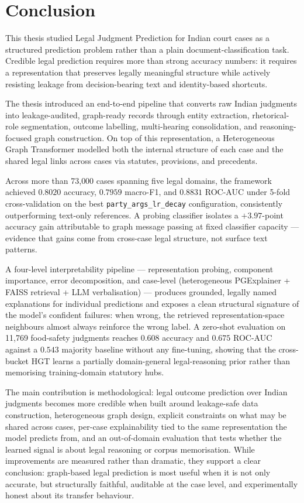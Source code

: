 \chapter{Conclusion}

This thesis studied Legal Judgment Prediction for Indian court cases as a structured prediction problem rather than a plain document-classification task. Credible legal prediction requires more than strong accuracy numbers: it requires a representation that preserves legally meaningful structure while actively resisting leakage from decision-bearing text and identity-based shortcuts.

The thesis introduced an end-to-end pipeline that converts raw Indian judgments into leakage-audited, graph-ready records through entity extraction, rhetorical-role segmentation, outcome labelling, multi-hearing consolidation, and reasoning-focused graph construction. On top of this representation, a Heterogeneous Graph Transformer modelled both the internal structure of each case and the shared legal links across cases via statutes, provisions, and precedents.

Across more than 73{,}000 cases spanning five legal domains, the framework achieved $0.8020$ accuracy, $0.7959$ macro-F1, and $0.8831$ ROC-AUC under 5-fold cross-validation on the best \texttt{party\_args\_lr\_decay} configuration, consistently outperforming text-only references. A probing classifier isolates a $+3.97$-point accuracy gain attributable to graph message passing at fixed classifier capacity --- evidence that gains come from cross-case legal structure, not surface text patterns.

A four-level interpretability pipeline --- representation probing, component importance, error decomposition, and case-level  (heterogeneous PGExplainer + FAISS retrieval + LLM verbalisation) --- produces grounded, legally named explanations for individual predictions and exposes a clean structural signature of the model's confident failures: when wrong, the retrieved representation-space neighbours almost always reinforce the wrong label. A zero-shot evaluation on 11{,}769 food-safety judgments reaches $0.608$ accuracy and $0.675$ ROC-AUC against a $0.543$ majority baseline without any fine-tuning, showing that the cross-bucket HGT learns a partially domain-general legal-reasoning prior rather than memorising training-domain statutory hubs.

The main contribution is methodological: legal outcome prediction over Indian judgments becomes more credible when built around leakage-safe data construction, heterogeneous graph design, explicit constraints on what may be shared across cases, per-case explainability tied to the same representation the model predicts from, and an out-of-domain evaluation that tests whether the learned signal is about legal reasoning or corpus memorisation. While improvements are measured rather than dramatic, they support a clear conclusion: graph-based legal prediction is most useful when it is not only accurate, but structurally faithful, auditable at the case level, and experimentally honest about its transfer behaviour.

